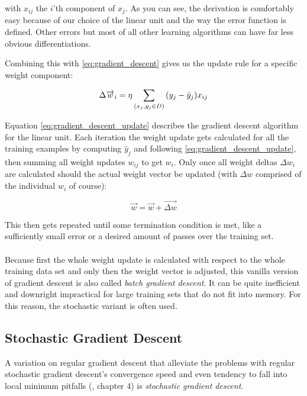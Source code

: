 with $x_{ij}$ the $i$'th component of $x_j$.
As you can see, the derivation is comfortably easy
because of our choice of the linear unit
and the way the error function is defined.
Other errors but most of all other learning
algorithms can have far less obvious differentiations.

Combining this with \ref{eq:gradient_descent}
gives us the update rule for a specific weight component:

\begin{equation}
  \Delta \overrightarrow{w}_i = \eta \sum_{(x_j, y_j \in D)} \\
  (y_j - \hat{y}_j) x_{ij}
  \label{eq:gradient_descent_update}
\end{equation}

Equation \ref{eq:gradient_descent_update}
describes the gradient descent algorithm for the linear unit.
Each iteration the weight update gets calculated
for all the training examples by computing $\hat{y}_j$
and following \ref{eq:gradient_descent_update},
then summing all weight updates $w_{ij}$
to get $w_i$.
Only once all weight deltas $\Delta w_i$
are calculated should the actual weight vector be updated
(with $\Delta w$ comprised of the individual $w_i$ of course):

\begin{equation}
  \overrightarrow{w} = \overrightarrow{w} + \overrightarrow{\Delta w}
\end{equation}

This then gets repeated until some termination condition is met,
like a sufficiently small error or a desired amount of passes
over the training set.

\paragraph{}
Because first the whole weight update is calculated
with respect to the whole training data set
and only then the weight vector is adjusted,
this vanilla version of gradient descent is also
called \textit{batch gradient descent}.
It can be quite inefficient and downright
impractical for large training sets that do not fit into memory.
For this reason,
the stochastic variant is often used.

\subsection{Stochastic Gradient Descent}
A variation on regular gradient descent
that alleviate the problems
with regular stochastic gradient descent's
convergence speed and even tendency to fall
into local minimum pitfalls
(\cite{mitchell1997}, chapter 4)
is \textit{stochastic gradient descent}.


